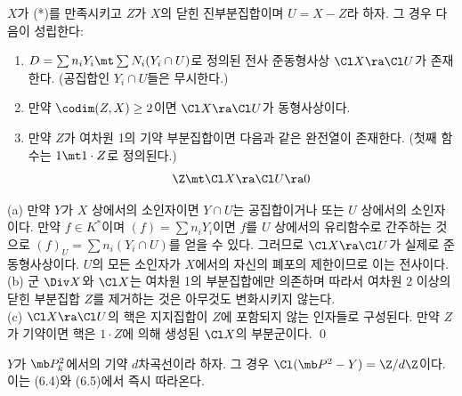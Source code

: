 	
	\begin{proposition}
	$X$가 (*)를 만족시키고 $Z$가 $X$의 닫힌 진부분집합이며 $U=X-Z$라 하자. 그 경우 다음이 성립한다:
	\begin{enumerate}[label=(\alph*)]
	\item $D=\sum n_iY_i\mt\sum N_i(Y_i\cap U)$로 정의된 전사 준동형사상 $\Cl X\ra\Cl U$가 존재한다.
	(공집합인 $Y_i\cap U$들은 무시한다.)
	\item 만약 $\codim(Z,X)\ge 2$이면 $\Cl X\ra\Cl U$가 동형사상이다.
	\item 만약 $Z$가 여차원 1의 기약 부분집합이면 다음과 같은 완전열이 존재한다. (첫째 함수는 $1\mt 1\cdot Z$로 정의된다.)
	$$\Z\mt\Cl X\ra\Cl U\ra 0$$
	\end{enumerate}
	\pf (a) 만약 $Y$가 $X$ 상에서의 소인자이면 $Y\cap U$는 공집합이거나 또는 $U$ 상에서의 소인자이다.
	만약 $f\in K^*$이며 $(f)=\sum n_iY_i$이면 $f$를 $U$ 상에서의 유리함수로 간주하는 것으로
	$(f)_U=\sum n_i(Y_i\cap U)$를 얻을 수 있다. 그러므로 $\Cl X\ra\Cl U$가 실제로 준동형사상이다.
	$U$의 모든 소인자가 $X$에서의 자신의 폐포의 제한이므로 이는 전사이다.\\
	(b) 군 $\Div X$와 $\Cl X$는 여차원 1의 부분집합에만 의존하며
	따라서 여차원 2 이상의 닫힌 부분집합 $Z$를 제거하는 것은 아무것도 변화시키지 않는다.\\
	(c) $\Cl X\ra\Cl U$의 핵은 지지집합이 $Z$에 포함되지 않는 인자들로 구성된다.
	만약 $Z$가 기약이면 핵은 $1\cdot Z$에 의해 생성된 $\Cl X$의 부분군이다.
	\qed
	\end{proposition}
	
	
	\begin{example}
	$Y$가 $\mb P_k^2$에서의 기약 $d$차곡선이라 하자. 그 경우 $\Cl(\mb P^2-Y)=\Z/d\Z$이다. 이는 (6.4)와 (6.5)에서 즉시 따라온다.
	\end{example}
	
